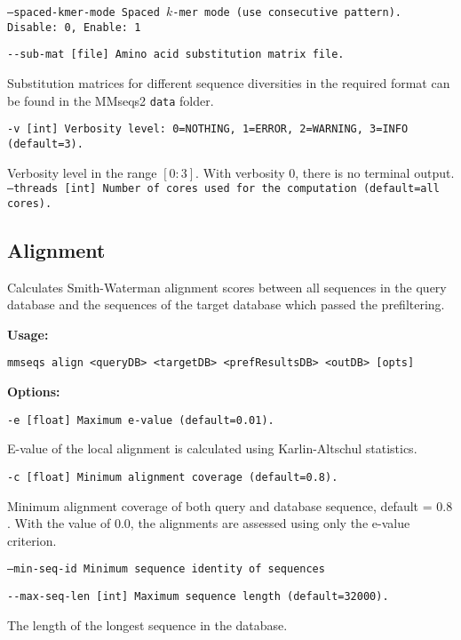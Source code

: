 \documentclass[11pt,a4paper]{scrreprt}
\begin{document}
\texttt{\small --spaced-kmer-mode       Spaced $k$-mer mode (use consecutive pattern). Disable: 0, Enable: 1}{\small \par}


\texttt{\small -{}-sub-mat {[}file{]} Amino acid substitution matrix file.}{\small \par}


Substitution matrices for different sequence diversities in the required format can be found in the MMseqs2 \texttt{data} folder.


\texttt{\small -v {[}int{]} Verbosity level: 0=NOTHING, 1=ERROR, 2=WARNING, 3=INFO (default=3).}{\small \par}


Verbosity level in the range $[0:3]$. With verbosity $0$, there is no terminal output.
\texttt{\small --threads {[}int{]} Number of cores used for the computation (default=all cores).}{\small \par}
\subsection{Alignment}
Calculates Smith-Waterman alignment scores between all sequences in the query database and the sequences of the target database which passed the prefiltering.


\textbf{Usage:}


\texttt{mmseqs align <queryDB> <targetDB> <prefResultsDB> <outDB> {[}opts{]}}


\textbf{Options:}


\texttt{\small -e {[}float{]} Maximum e-value (default=0.01).}{\small \par}


E-value of the local alignment is calculated using Karlin-Altschul statistics.


\texttt{\small -c {[}float{]} Minimum alignment coverage (default=0.8).}{\small \par}


Minimum alignment coverage of both query and database sequence, default = $0.8$. With the value of $0.0$, the alignments are assessed using only the e-value criterion.


\texttt{\small --min-seq-id Minimum sequence identity of sequences}{\small \par}


\texttt{\small -{}-max-seq-len {[}int{]} Maximum sequence length (default=32000).}{\small \par}


The length of the longest sequence in the database.
\end{document}
